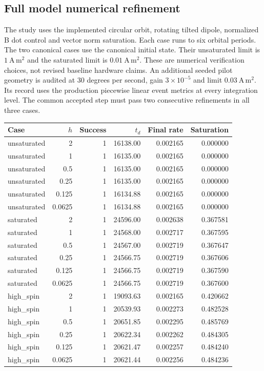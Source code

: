 \subsection{Full model numerical refinement}
The study uses the implemented circular orbit, rotating tilted dipole,
normalized B dot control and vector norm saturation. Each case runs to six
orbital periods. The two canonical cases use the canonical initial state. Their unsaturated limit is
$1\ \mathrm{A\,m^2}$ and the saturated limit is $0.01\ \mathrm{A\,m^2}$.
These are numerical verification choices, not revised baseline hardware claims.
An additional seeded pilot geometry is audited at 30 degrees per second,
gain $3\times10^{-5}$ and limit $0.03\ \mathrm{A\,m^2}$. Its record uses
the production piecewise linear event metrics at every integration level.
The common accepted step must pass two consecutive refinements in all three cases.
\begin{center}
\begin{tabular}{lrrrrr}
Case & $h$ & Success & $t_d$ & Final rate & Saturation \\
\hline
unsaturated & 2 & 1 & 16138.00 & 0.002165 & 0.000000 \\
unsaturated & 1 & 1 & 16135.00 & 0.002165 & 0.000000 \\
unsaturated & 0.5 & 1 & 16135.00 & 0.002165 & 0.000000 \\
unsaturated & 0.25 & 1 & 16135.00 & 0.002165 & 0.000000 \\
unsaturated & 0.125 & 1 & 16134.88 & 0.002165 & 0.000000 \\
unsaturated & 0.0625 & 1 & 16134.88 & 0.002165 & 0.000000 \\
saturated & 2 & 1 & 24596.00 & 0.002638 & 0.367581 \\
saturated & 1 & 1 & 24568.00 & 0.002717 & 0.367595 \\
saturated & 0.5 & 1 & 24567.00 & 0.002719 & 0.367647 \\
saturated & 0.25 & 1 & 24566.75 & 0.002719 & 0.367606 \\
saturated & 0.125 & 1 & 24566.75 & 0.002719 & 0.367590 \\
saturated & 0.0625 & 1 & 24566.75 & 0.002719 & 0.367600 \\
high\_spin & 2 & 1 & 19093.63 & 0.002165 & 0.420662 \\
high\_spin & 1 & 1 & 20539.93 & 0.002273 & 0.482528 \\
high\_spin & 0.5 & 1 & 20651.85 & 0.002295 & 0.485769 \\
high\_spin & 0.25 & 1 & 20622.34 & 0.002262 & 0.484305 \\
high\_spin & 0.125 & 1 & 20621.47 & 0.002257 & 0.484240 \\
high\_spin & 0.0625 & 1 & 20621.44 & 0.002256 & 0.484236 \\
\end{tabular}
\end{center}
